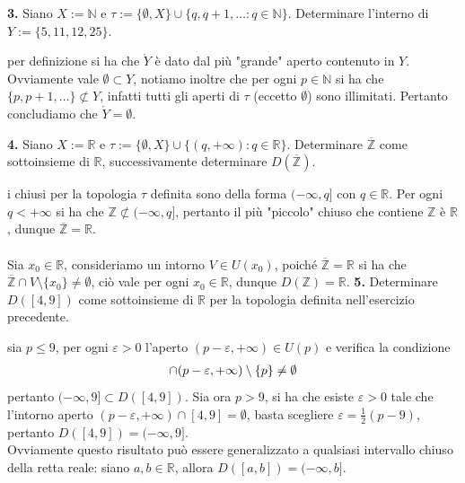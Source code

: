 \documentclass[oneside, 11pt]{amsbook}
\makeatletter
\newcommand{\0}{{(0)}}
\newcommand{\3}{{(3)}}
\theoremstyle{colonplain}
\theoremstyle{colondefinition}
\theoremstyle{colonremark}
\numberwithin{equation}{chapter}
\renewcommand{\proofname}{Dimostrazione}
\renewenvironment{proof}[1][\proofname]{\par
  \pushQED{\qed}%
  \normalfont \topsep6\p@\@plus6\p@\relax
  \trivlist
  \item[\hskip\labelsep\bfseries #1:]\ignorespaces
}{%
  \popQED\endtrivlist\@endpefalse
}
\makeatother
\begin{document}
\textbf{3.} Siano $X := \mathbb{N}$ e $\tau := \{ \emptyset, X \} \cup \{q, q+1, \dots : q \in \mathbb{N} \}$. Determinare l'interno di $Y := \{ 5, 11, 12, 25 \}$.
\begin{proof} 
per definizione si ha che $\mathring{Y}$ è dato dal più "grande" aperto contenuto in $Y$. Ovviamente vale $\emptyset \subset Y$, notiamo inoltre che per ogni $p \in \mathbb{N}$ si ha che $\{ p, p+1, \dots \} \not\subset Y$, infatti tutti gli aperti di $\tau$ (eccetto $\emptyset$) sono illimitati. Pertanto concludiamo che $\mathring{Y} = \emptyset$.
\end{proof}

\textbf{4.} Siano $X := \mathbb{R}$ e $\tau := \{ \emptyset, X \} \cup \{ (q, +\infty) : q \in \mathbb{R} \}$. Determinare $\overline{\mathbb{Z}}$ come sottoinsieme di $\mathbb{R}$, successivamente determinare $D(\mathbb{\overline{Z}})$.
\begin{proof}
i chiusi per la topologia $\tau$ definita sono della forma $(-\infty, q]$ con $q \in \mathbb{R}$. Per ogni $q < +\infty$ si ha che $\mathbb{Z} \not\subset (-\infty, q]$, pertanto il più "piccolo" chiuso che contiene $\mathbb{Z}$ è $\mathbb{R}$, dunque $\overline{\mathbb{Z}} = \mathbb{R}$. \\ \\
Sia $x_0 \in \mathbb{R}$, consideriamo un intorno $V \in U(x_0)$, poiché $\overline{\mathbb{Z}} = \mathbb{R}$ si ha che $\overline{\mathbb{Z}} \cap V \setminus \{ x_0 \} \neq \emptyset$, ciò vale per ogni $x_0 \in \mathbb{R}$, dunque $D(\mathbb{Z}) = \mathbb{R}$.
\end{proof}
\textbf{5.} Determinare $D([4, 9])$ come sottoinsieme di $\mathbb{R}$ per la topologia definita nell'esercizio precedente.
\begin{proof} sia $p \leq 9$, per ogni $\varepsilon > 0$ l'aperto $(p - \varepsilon, +\infty) \in U(p)$ e verifica la condizione
\begin{align}
    [4, 9] \cap (p - \varepsilon, +\infty) \setminus \{ p \} \neq \emptyset \notag
\end{align}
pertanto $(-\infty, 9] \subset D([4, 9])$. Sia ora $p > 9$, si ha che esiste $\varepsilon > 0$ tale che l'intorno aperto $(p - \varepsilon, +\infty) \cap [4, 9] = \emptyset$, basta scegliere $\varepsilon = \frac{1}{2}(p - 9)$, pertanto $D([4, 9]) = (-\infty, 9]$. \\
Ovviamente questo risultato può essere generalizzato a qualsiasi intervallo chiuso della retta reale: siano $a, b \in \mathbb{R}$, allora $D([a, b]) = (-\infty, b]$.
\end{proof}
\end{document}
